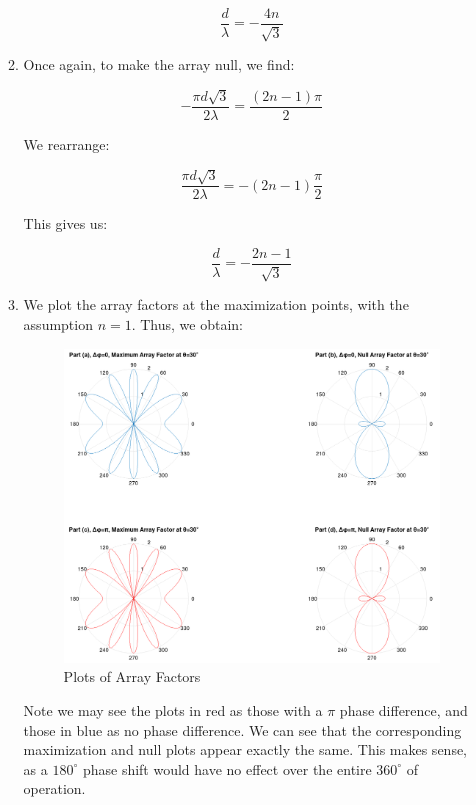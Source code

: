 \begin{enumerate}
\begin{enumerate}
        $$\boxed{\frac{d}{\lambda}=-\frac{4n}{\sqrt{3}}}$$

      \item 

        Once again, to make the array null, we find:

        $$-\frac{\pi d\sqrt{3}}{2\lambda}=\frac{(2n-1)\pi}{2}$$

        We rearrange:

        $$\frac{\pi d\sqrt{3}}{2\lambda}=-\left( 2n-1\right)\frac{\pi}{2}$$

        This gives us:

        $$\boxed{\frac{d}{\lambda}=-\frac{2n-1}{\sqrt{3}}}$$

    \newpage

      \item 

        We plot the array factors at the maximization points, with the assumption $n=1$. Thus, we obtain:

        \begin{figure}[h!]
          \centering
          \includegraphics[width=.9\textwidth]{Figures/AFPlots.png}
          \caption{Plots of Array Factors}
          \label{fig:1}
        \end{figure}

        Note we may see the plots in red as those with a $\pi$ phase difference, and those in blue as no phase difference. We can see that the corresponding maximization and null plots appear exactly the same. This makes sense, as a $180^{\circ}$ phase shift would have no effect over the entire $360^{\circ}$ of operation.


\end{enumerate}
\end{enumerate}
